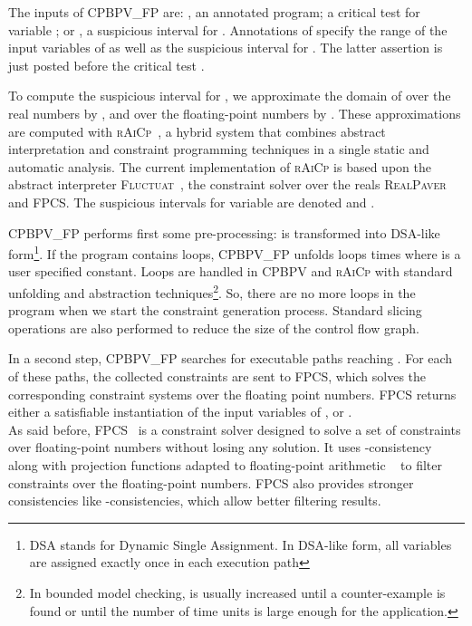 \documentclass[a4paper]{llncs}
\newcommand{\FLUCTUAT}{\textsc{Fluctuat}}
\newcommand{\FPCS}{\textsc{FPCS}}
\newcommand{\RAICP}{\textsc{rAiCp}}
\newcommand{\REALPAVER}{\textsc{RealPaver}}
\newcommand{\CPBPV}{\textsc{CPBPV}}
\newcommand{\OUR}{\textsc{CPBPV\_FP}}
\begin{document}
The inputs of \OUR{} are: , an annotated program; a critical test 
for variable ;   or
, a suspicious interval for . 
Annotations of  specify the range of the input variables of  as well as the suspicious interval for . The latter assertion is just posted before the critical test .

To compute the suspicious interval for , we approximate the domain
of  over the real numbers by , and over the
floating-point numbers by . These
approximations are computed with
\RAICP{}~\cite{ponsiniMichelRueher14}, a hybrid system that combines
abstract interpretation and constraint programming techniques in a
single static and automatic analysis. The current implementation of
\RAICP{} is based upon the abstract interpreter
\FLUCTUAT{}~\cite{delmasGoubaultPutotSouyrisTekkalVedrine09}, the constraint solver over the reals \REALPAVER{}~\cite{granvilliersBenhamou06} and \FPCS{}.
The suspicious intervals for variable  are denoted
 and
. 

\OUR{} performs first some pre-processing:  is transformed into DSA-like
form\footnote{DSA stands for Dynamic Single Assignment. In DSA-like form, all variables are assigned exactly
  once in each execution path}. If the program contains loops, \OUR{} unfolds loops  times where  is a user specified constant.  Loops are handled in  \CPBPV{} and \RAICP{} with standard unfolding and abstraction techniques\footnote{In bounded model checking,  is usually increased  until a counter-example is found or until the number of time units is large enough for the application.
}. So, there are no more loops in the program when we start the constraint generation process.  Standard slicing operations are also performed to reduce the size of the control flow graph.

In a second step,  \OUR{} searches for executable paths reaching . For each of these paths, the collected constraints are sent to \FPCS{}, which solves the corresponding constraint systems over the floating point numbers. \FPCS{} returns either a  satisfiable instantiation of the input variables of , or  .\\
 As said before, \FPCS{}~\cite{michelRueherLebbah01,michel02,botellaGotliebMichel06,marreMichel10}
  is a constraint solver designed to solve a set of constraints over
  floating-point numbers without losing any solution.  It uses 
  -consistency along with projection functions adapted to
  floating-point arithmetic ~\cite{michel02,botellaGotliebMichel06} 
  to  filter constraints over the floating-point numbers.  \FPCS{}
  also provides stronger consistencies like -consistencies, which
  allow better filtering results.  
\end{document}
